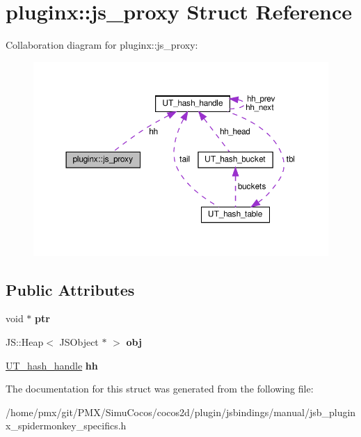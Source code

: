 \hypertarget{structpluginx_1_1js__proxy}{}\section{pluginx\+:\+:js\+\_\+proxy Struct Reference}
\label{structpluginx_1_1js__proxy}


Collaboration diagram for pluginx\+:\+:js\+\_\+proxy\+:
\nopagebreak
\begin{figure}[H]
\begin{center}
\leavevmode
\includegraphics[width=350pt]{structpluginx_1_1js__proxy__coll__graph}
\end{center}
\end{figure}
\subsection*{Public Attributes}
\begin{DoxyCompactItemize}
\item 
\mbox{\label{structpluginx_1_1js__proxy_a3dca38f88f4eece9fe826b88582e0c2a}} 
void $\ast$ {\bfseries ptr}
\item 
\mbox{\label{structpluginx_1_1js__proxy_ac3e439d8193825865eab5a8223421540}} 
J\+S\+::\+Heap$<$ J\+S\+Object $\ast$ $>$ {\bfseries obj}
\item 
\mbox{\label{structpluginx_1_1js__proxy_a5ec63fcb0933cae4dee4f011ef9ff6e6}} 
\hyperlink{structUT__hash__handle}{U\+T\+\_\+hash\+\_\+handle} {\bfseries hh}
\end{DoxyCompactItemize}


The documentation for this struct was generated from the following file\+:\begin{DoxyCompactItemize}
\item 
/home/pmx/git/\+P\+M\+X/\+Simu\+Cocos/cocos2d/plugin/jsbindings/manual/jsb\+\_\+pluginx\+\_\+spidermonkey\+\_\+specifics.\+h\end{DoxyCompactItemize}
